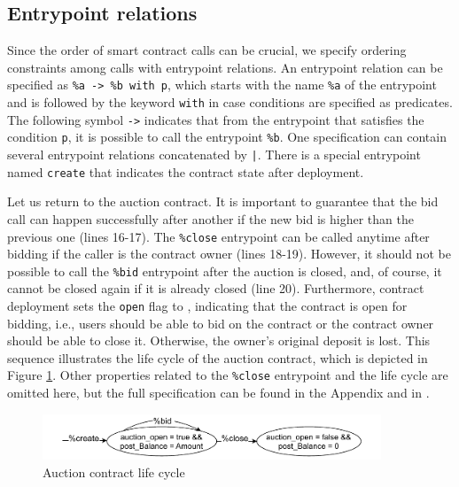 \documentclass[runningheads]{llncs}
\begin{document}
\subsection{Entrypoint relations}
\label{sec:entrypoint-relations}
Since the order of smart contract
calls can be crucial, we specify ordering constraints among calls with
 entrypoint relations. An entrypoint relation can be specified as
\lstinline/%a -> %b with p/, which starts with the name
\lstinline/%a/ of the entrypoint and is followed by the keyword
\lstinline/with/ in case conditions are specified as predicates. The
following symbol \lstinline/->/ indicates that from the entrypoint
that satisfies the condition \lstinline/p/, it is possible  to call
the entrypoint \lstinline/%b/. One specification can
contain several entrypoint relations concatenated by
\lstinline/|/. There is a special entrypoint named \lstinline/create/
that indicates the contract state after deployment. 

Let us return to the auction contract. It is important to guarantee
that  the bid call can happen successfully after another if the new bid is higher than the previous
one (lines 16-17). The  \lstinline/%close/ entrypoint can be called
anytime after bidding if the caller is the contract owner (lines 18-19). However, it
should not be possible to call the  \lstinline/%bid/ entrypoint after
the auction is closed, and, of course, it cannot be closed
again if it is already closed (line 20).  Furthermore, contract deployment sets the  \lstinline/open/ flag to
\TRUE, indicating that the contract is open for bidding, i.e., users
should be able to bid on the contract or the contract owner should be
able to close it. Otherwise, the owner's original
deposit is lost. This sequence  illustrates
the life cycle of the auction contract, which is depicted in Figure
\ref{fig:auction-life-cycle}. Other properties related to the \lstinline|%close| entrypoint and the life cycle are omitted here, but the full specification can be found in the Appendix and in \cite{}.

\begin{figure}[tp]
    \centering
    \includegraphics[width=0.9\textwidth]{auction}
    \caption{Auction contract life cycle}
    \label{fig:auction-life-cycle}
\end{figure}
\end{document}
